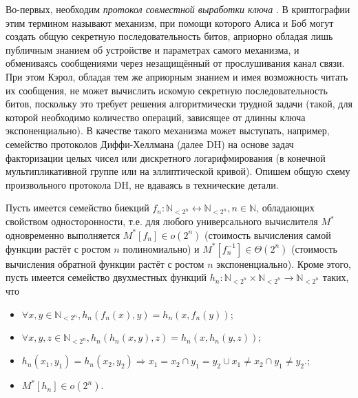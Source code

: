 Во-первых, необходим \emph{протокол совместной выработки ключа} \cite{Boyd}. В криптографии этим термином называют механизм, при помощи которого Алиса и Боб могут создать общую секретную последовательность битов, априорно обладая лишь публичным знанием об устройстве и параметрах самого механизма, и обмениваясь сообщениями через незащищённый от прослушивания канал связи. При этом Кэрол, обладая тем же априорным знанием и имея возможность читать их сообщения, не может вычислить искомую секретную последовательность битов, поскольку это требует решения алгоритмически трудной задачи (такой, для которой необходимо количество операций, зависящее от длинны ключа экспоненциально). В качестве такого механизма может выступать, например, семейство протоколов Диффи-Хеллмана (далее DH) на основе задач факторизации целых чисел или дискретного логарифмирования (в конечной мультипликативной группе или на эллиптической кривой). Опишем общую схему произвольного протокола DH, не вдаваясь в технические детали.

Пусть имеется семейство биекций $f_n: \mathbb{N}_{<2^n} \leftrightarrow \mathbb{N}_{<2^n}, n \in \mathbb{N}$, обладающих свойством односторонности, т.е. для любого универсального вычислителя $M^*$ одновременно выполняется $M^*[f_n] \in o(2^n)$ (стоимость вычисления самой функции растёт с ростом $n$ полиномиально) и $M^*[f_n^{-1}] \in \Theta(2^n)$ (стоимость вычисления обратной функции растёт с ростом $n$ экспоненциально). Кроме этого, пусть имеется семейство двухместных функций $h_n : \mathbb{N}_{<2^n} \times \mathbb{N}_{<2^n} \rightarrow \mathbb{N}_{<2^n}$ таких, что
\begin{itemize}
	\item $\forall x, y \in \mathbb{N}_{<2^n}, h_n(f_n(x), y) = h_n(x, f_n(y))$;
	\item $\forall x, y, z \in \mathbb{N}_{<2^n}, h_n(h_n(x, y), z) = h_n(x, h_n(y, z))$;
	\item $h_n(x_1, y_1) = h_n(x_2, y_2) \Rightarrow x_1 = x_2 \cap y_1 = y_2 \cup x_1 \neq x_2 \cap y_1 \neq y_2$.;
	\item $M^*[h_n] \in o(2^n)$.
\end{itemize}

